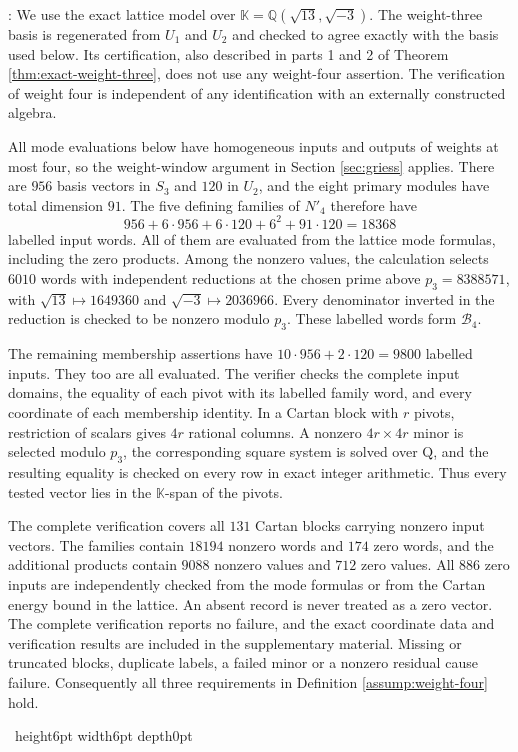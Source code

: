 \documentclass[leqno]{article}
\newcommand{\K}{\ensuremath{\mathbb{K}}}
\newcommand{\Q}{\mathrm{Q}}
\newcommand{\qed}{\hfill \vrule height6pt  width6pt depth0pt}
\newenvironment{proof}[1][]{\noindent {\it Proof #1} : }{\hbox{~}\qed
\smallskip
}
\numberwithin{equation}{section}
\begin{document}
\begin{proof}
We use the exact lattice model over $\K = \mathbb{Q}(\sqrt{13},\sqrt{-3})$. The weight-three basis is regenerated from $U_1$ and $U_2$ and checked to agree exactly with the basis used below. Its certification, also described in parts 1 and 2 of Theorem \ref{thm:exact-weight-three}, does not use any weight-four assertion. The verification of weight four is independent of any identification with an externally constructed algebra.

All mode evaluations below have homogeneous inputs and outputs of weights at most four, so the weight-window argument in Section \ref{sec:griess} applies. There are $956$ basis vectors in $S_3$ and $120$ in $U_2$, and the eight primary modules have total dimension $91$. The five defining families of $N'_4$ therefore have
\[
956 + 6 \cdot 956 + 6 \cdot 120 + 6^2 + 91 \cdot 120 = 18368
\]
labelled input words. All of them are evaluated from the lattice mode formulas, including the zero products. Among the nonzero values, the calculation selects $6010$ words with independent reductions at the chosen prime above $p_3 = 8388571$, with $\sqrt{13} \mapsto 1649360$ and $\sqrt{-3} \mapsto 2036966$. Every denominator inverted in the reduction is checked to be nonzero modulo $p_3$. These labelled words form $\mathcal B_4$.

The remaining membership assertions have $10 \cdot 956+2 \cdot 120 = 9800$ labelled inputs. They too are all evaluated. The verifier checks the complete input domains, the equality of each pivot with its labelled family word, and every coordinate of each membership identity. In a Cartan block with $r$ pivots, restriction of scalars gives $4r$ rational columns. A nonzero $4r \times 4r$ minor is selected modulo $p_3$, the corresponding square system is solved over $\Q$, and the resulting equality is checked on every row in exact integer arithmetic. Thus every tested vector lies in the $\K$-span of the pivots.

The complete verification covers all $131$ Cartan blocks carrying nonzero input vectors. The families contain $18194$ nonzero words and $174$ zero words, and the additional products contain $9088$ nonzero values and $712$ zero values. All $886$ zero inputs are independently checked from the mode formulas or from the Cartan energy bound in the lattice. An absent record is never treated as a zero vector. The complete verification reports no failure, and the exact coordinate data and verification results are included in the supplementary material. Missing or truncated blocks, duplicate labels, a failed minor or a nonzero residual cause failure. Consequently all three requirements in Definition \ref{assump:weight-four} hold.


\end{proof}
\end{document}
